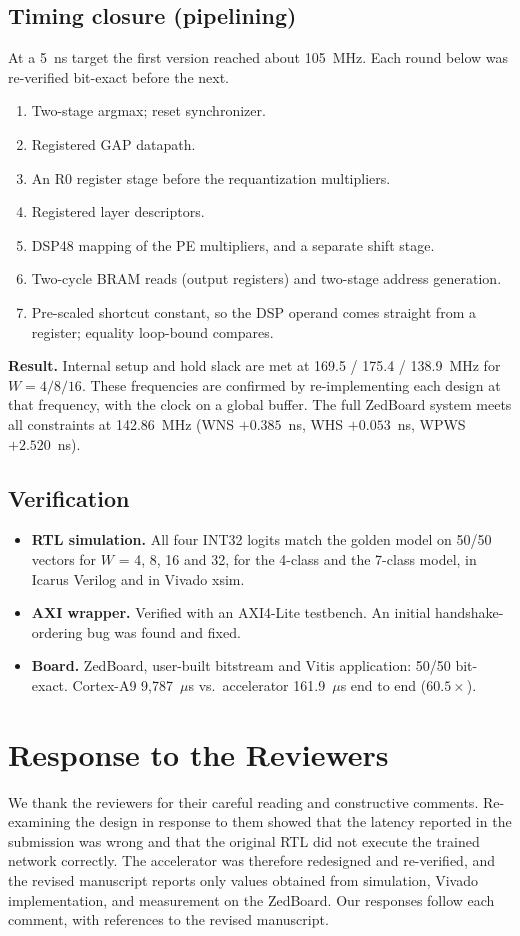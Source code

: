 \documentclass[10pt,a4paper]{article}
\begin{document}
\subsection{Timing closure (pipelining)}
At a 5~ns target the first version reached about 105~MHz. Each round below was re-verified
bit-exact before the next.
\begin{enumerate}
  \item Two-stage argmax; reset synchronizer.
  \item Registered GAP datapath.
  \item An R0 register stage before the requantization multipliers.
  \item Registered layer descriptors.
  \item DSP48 mapping of the PE multipliers, and a separate shift stage.
  \item Two-cycle BRAM reads (output registers) and two-stage address generation.
  \item Pre-scaled shortcut constant, so the DSP operand comes straight from a register;
  equality loop-bound compares.
\end{enumerate}
\textbf{Result.} Internal setup and hold slack are met at 169.5 / 175.4 / 138.9~MHz for
$W=4/8/16$. These frequencies are confirmed by re-implementing each design at that frequency,
with the clock on a global buffer. The full ZedBoard system meets all constraints at 142.86~MHz
(WNS $+0.385$~ns, WHS $+0.053$~ns, WPWS $+2.520$~ns).

\subsection{Verification}
\begin{itemize}
  \item \textbf{RTL simulation.} All four INT32 logits match the golden model on 50/50 vectors
  for $W$ = 4, 8, 16 and 32, for the 4-class and the 7-class model, in Icarus Verilog and in
  Vivado xsim.
  \item \textbf{AXI wrapper.} Verified with an AXI4-Lite testbench. An initial
  handshake-ordering bug was found and fixed.
  \item \textbf{Board.} ZedBoard, user-built bitstream and Vitis application: 50/50 bit-exact.
  Cortex-A9 9,787~$\mu$s vs.\ accelerator 161.9~$\mu$s end to end ($60.5\times$).
\end{itemize}

\section{Response to the Reviewers}
We thank the reviewers for their careful reading and constructive comments. Re-examining the
design in response to them showed that the latency reported in the submission was wrong and
that the original RTL did not execute the trained network correctly. The accelerator was
therefore redesigned and re-verified, and the revised manuscript reports only values obtained
from simulation, Vivado implementation, and measurement on the ZedBoard. Our responses follow
each comment, with references to the revised manuscript.
\end{document}
